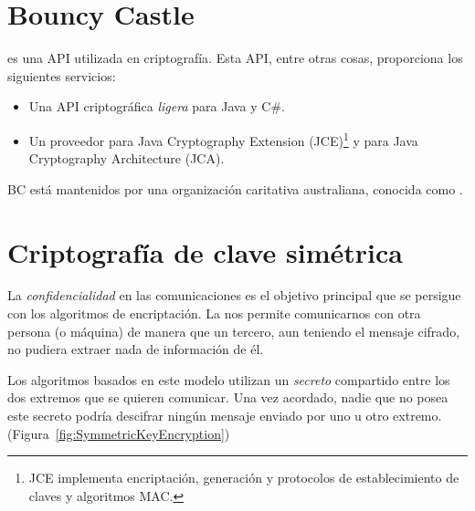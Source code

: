 
 \section{Bouncy Castle}

  es una API utilizada en criptografía.
 Esta API, entre otras cosas, proporciona los siguientes servicios:
 \begin{itemize}
 \item Una API criptográfica \emph{ligera} para Java y C\#.
 \item Un proveedor para Java Cryptography Extension (JCE)\footnote{JCE implementa encriptación, generación y protocolos de establecimiento de claves y algoritmos MAC.} y para Java Cryptography Architecture (JCA).
 \end{itemize}

 BC está mantenidos por una organización caritativa australiana, conocida como . \emph{\parencite{Reference4}}


 \section{Criptografía de clave simétrica}

 La \emph{confidencialidad} en las comunicaciones es el objetivo principal que se persigue con los algoritmos de encriptación.
 La  nos permite comunicarnos con otra persona (o máquina) de manera que un tercero,
 aun teniendo el mensaje cifrado, no pudiera extraer nada de información de él.

 Los algoritmos basados en este modelo utilizan un \emph{secreto} compartido entre los dos extremos que se quieren comunicar.
 Una vez acordado, nadie que no posea este secreto podría descifrar ningún mensaje enviado por uno u otro extremo.
 (Figura~\ref{fig:SymmetricKeyEncryption})

